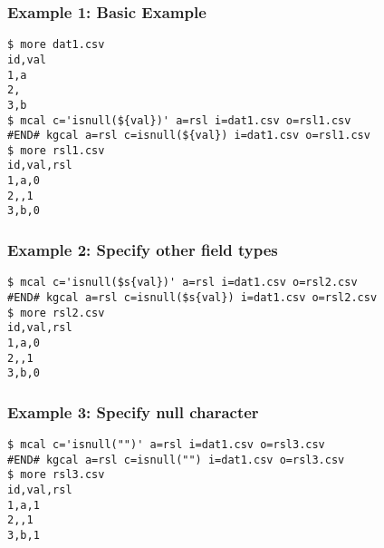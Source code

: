 \subsubsection*{Example 1: Basic Example}



\begin{Verbatim}[baselinestretch=0.7,frame=single]
$ more dat1.csv
id,val
1,a
2,
3,b
$ mcal c='isnull(${val})' a=rsl i=dat1.csv o=rsl1.csv
#END# kgcal a=rsl c=isnull(${val}) i=dat1.csv o=rsl1.csv
$ more rsl1.csv
id,val,rsl
1,a,0
2,,1
3,b,0
\end{Verbatim}
\subsubsection*{Example 2: Specify other field types}



\begin{Verbatim}[baselinestretch=0.7,frame=single]
$ mcal c='isnull($s{val})' a=rsl i=dat1.csv o=rsl2.csv
#END# kgcal a=rsl c=isnull($s{val}) i=dat1.csv o=rsl2.csv
$ more rsl2.csv
id,val,rsl
1,a,0
2,,1
3,b,0
\end{Verbatim}
\subsubsection*{Example 3: Specify null character}



\begin{Verbatim}[baselinestretch=0.7,frame=single]
$ mcal c='isnull("")' a=rsl i=dat1.csv o=rsl3.csv
#END# kgcal a=rsl c=isnull("") i=dat1.csv o=rsl3.csv
$ more rsl3.csv
id,val,rsl
1,a,1
2,,1
3,b,1
\end{Verbatim}
